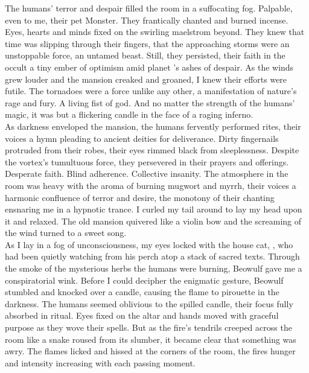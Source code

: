
The humans' terror and despair filled the room in a suffocating fog. Palpable, even to me, their pet  Monster. They frantically chanted and burned incense. Eyes, hearts and minds fixed on the swirling maelstrom beyond. They knew that time was slipping through their fingers, that the approaching storms were an unstoppable force, an untamed beast. Still, they persisted, their faith in the occult a tiny ember of optimism amid planet 's ashes of despair. As the winds grew louder and the mansion creaked and groaned, I knew their efforts were futile. The tornadoes were a force unlike any other, a manifestation of nature's rage and fury. A living fist of god. And no matter the strength of the humans' magic, it was but a flickering candle in the face of a raging inferno.\\

As darkness enveloped the mansion, the humans fervently performed rites, their voices a hymn pleading to ancient deities for deliverance. Dirty fingernails protruded from their robes, their eyes rimmed black from sleeplessness. Despite the vortex's tumultuous force, they persevered in their prayers and offerings. Desperate faith. Blind adherence. Collective insanity. The atmosphere in the room was heavy with the aroma of burning mugwort and myrrh, their voices a harmonic confluence of terror and desire, the monotony of their chanting ensnaring me in a hypnotic trance. I curled my tail around to lay my head upon it and relaxed. The old mansion quivered like a violin bow and the screaming of the wind turned to a sweet song.\\

As I lay in a fog of unconsciousness, my eyes locked with the house cat, , who had been quietly watching from his perch atop a stack of sacred texts. Through the smoke of the mysterious herbs the humans were burning, Beowulf gave me a conspiratorial wink. Before I could decipher the enigmatic gesture, Beowulf stumbled and knocked over a candle, causing the flame to pirouette in the darkness. The humans seemed oblivious to the spilled candle, their focus fully absorbed in ritual. Eyes fixed on the altar and hands moved with graceful purpose as they wove their spells. But as the fire's tendrils creeped across the room like a snake roused from its slumber, it became clear that something was awry. The flames licked and hissed at the corners of the room, the fires hunger and intensity increasing with each passing moment.\\

